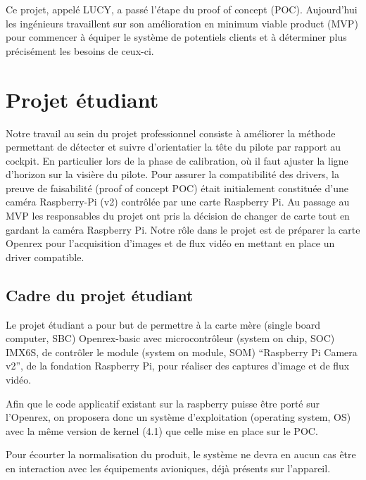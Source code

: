 Ce projet, appelé LUCY, a passé l’étape du proof of concept (POC). Aujourd’hui les ingénieurs
travaillent sur son amélioration en minimum viable product (MVP) pour commencer à équiper le système
de potentiels clients et à déterminer plus précisément les besoins de ceux-ci. 

\section{Projet étudiant}

Notre travail au sein du projet professionnel consiste à améliorer la méthode permettant de détecter et suivre
d’orientatier la tête du pilote par rapport au cockpit. En particulier lors de la phase de
calibration, où il faut ajuster la ligne d’horizon sur la visière du pilote. Pour assurer la
compatibilité des drivers, la preuve de faisabilité (proof of concept POC) était initialement
constituée d’une caméra Raspberry-Pi (v2) contrôlée par une carte Raspberry Pi. Au passage au MVP
les responsables du projet ont pris la décision de changer de carte tout en gardant la caméra
Raspberry Pi. Notre rôle dans le projet est de préparer la carte Openrex pour l’acquisition d’images
et de flux vidéo en mettant en place un driver compatible. 

\subsection{Cadre du projet étudiant}

Le projet étudiant a pour but de permettre à la carte mère (single board computer, SBC) Openrex-basic
avec microcontrôleur (system on chip, SOC) IMX6S, de contrôler le module (system on module, SOM)
“Raspberry Pi Camera v2”, de la fondation Raspberry Pi, pour réaliser des captures d’image et de flux
vidéo. \medskip

Afin que le code applicatif existant sur la raspberry puisse être porté sur l’Openrex, on proposera
donc un système d’exploitation (operating system, OS) avec la même version de kernel (4.1) que celle
mise en place sur le POC.\medskip

Pour écourter la normalisation du produit, le système ne devra en aucun cas être en interaction avec
les équipements avioniques, déjà présents sur l’appareil.
